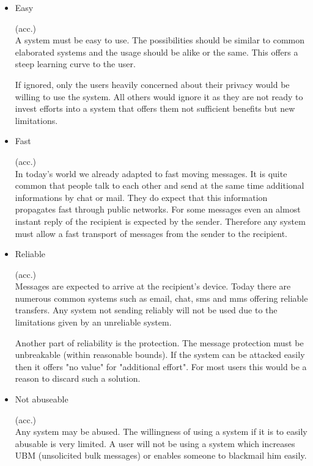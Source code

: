 \documentclass[12pt,journal,compsoc,peerreview]{IEEEtran}
\begin{document}
\makeatletter
\newcommand{\enumitem}[2]{\item{#2}\hfill\addtocounter{enumi}{1}(\entPrefix.\theenumi)\\}%
\newcommand{\enumref}[1]{\ref{itm:#1}}
\newenvironment{entity}[1]{\def\entPrefix{#1}\setcounter{enumi}{0}\begin{itemize}\itemsep5pt}{\end{itemize}}
\makeatother

\begin{entity}{acc}
	\enumitem{easy}{Easy}
	      A system must be easy to use. The possibilities should be similar to common elaborated systems and the usage should be alike or the same. This offers a steep learning curve to the user.\par
	      If ignored, only the users heavily concerned about their privacy would be willing to use the system. All others would ignore it as they are not ready to invest efforts into a system that offers them not sufficient benefits but new limitations.
	\enumitem{fast}{Fast}
	      In today's world we already adapted to fast moving messages. It is quite common that people talk to each other and send at the same time additional informations by chat or mail. They do expect that this information propagates fast through public networks. For some messages even an almost instant reply of the recipient is expected by the sender. Therefore any system must allow a fast transport of messages from the sender to the recipient.
	\enumitem{reliable}{Reliable}
	      Messages are expected to arrive at the recipient's device. Today there are numerous common systems such as email, chat, sms and mms offering reliable transfers. Any system not sending reliably will not be used due to the limitations given by an unreliable system. \par
	      Another part of reliability is the protection. The message protection must be unbreakable (within reasonable bounds). If the system can be attacked easily then it offers "no value" for "additional effort". For most users this would be a reason to discard such a solution.
	\enumitem{nabuseable}{Not abuseable}
	      Any system may be abused. The willingness of using a system if it is to easily abusable is very limited. A user will not be using a system which increases UBM (unsolicited bulk messages) or enables someone to blackmail him easily.
\end{entity}
\end{document}
